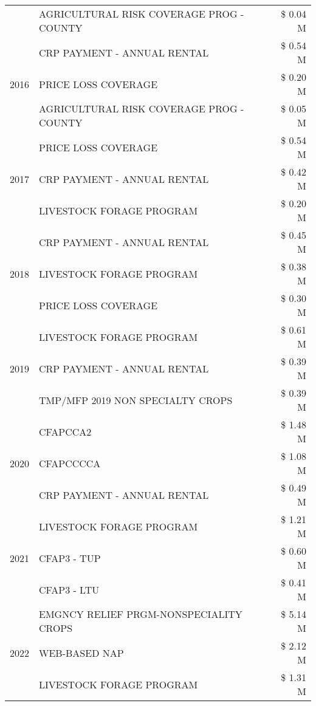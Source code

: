 \begin{tabular}{llr}
 & AGRICULTURAL RISK COVERAGE PROG - COUNTY & \$ 0.04 M \\
\cline{1-3}
\multirow[t]{3}{*}{2016} & CRP PAYMENT - ANNUAL RENTAL & \$ 0.54 M \\
 & PRICE LOSS COVERAGE & \$ 0.20 M \\
 & AGRICULTURAL RISK COVERAGE PROG - COUNTY & \$ 0.05 M \\
\cline{1-3}
\multirow[t]{3}{*}{2017} & PRICE LOSS COVERAGE & \$ 0.54 M \\
 & CRP PAYMENT - ANNUAL RENTAL & \$ 0.42 M \\
 & LIVESTOCK FORAGE PROGRAM & \$ 0.20 M \\
\cline{1-3}
\multirow[t]{3}{*}{2018} & CRP PAYMENT - ANNUAL RENTAL & \$ 0.45 M \\
 & LIVESTOCK FORAGE PROGRAM & \$ 0.38 M \\
 & PRICE LOSS COVERAGE & \$ 0.30 M \\
\cline{1-3}
\multirow[t]{3}{*}{2019} & LIVESTOCK FORAGE PROGRAM & \$ 0.61 M \\
 & CRP PAYMENT - ANNUAL RENTAL & \$ 0.39 M \\
 & TMP/MFP 2019 NON SPECIALTY CROPS & \$ 0.39 M \\
\cline{1-3}
\multirow[t]{3}{*}{2020} & CFAPCCA2 & \$ 1.48 M \\
 & CFAPCCCCA & \$ 1.08 M \\
 & CRP PAYMENT - ANNUAL RENTAL & \$ 0.49 M \\
\cline{1-3}
\multirow[t]{3}{*}{2021} & LIVESTOCK FORAGE PROGRAM & \$ 1.21 M \\
 & CFAP3 - TUP & \$ 0.60 M \\
 & CFAP3 - LTU & \$ 0.41 M \\
\cline{1-3}
\multirow[t]{3}{*}{2022} & EMGNCY RELIEF PRGM-NONSPECIALITY CROPS & \$ 5.14 M \\
 & WEB-BASED NAP & \$ 2.12 M \\
 & LIVESTOCK FORAGE PROGRAM & \$ 1.31 M \\
\cline{1-3}
\bottomrule
\end{tabular}
